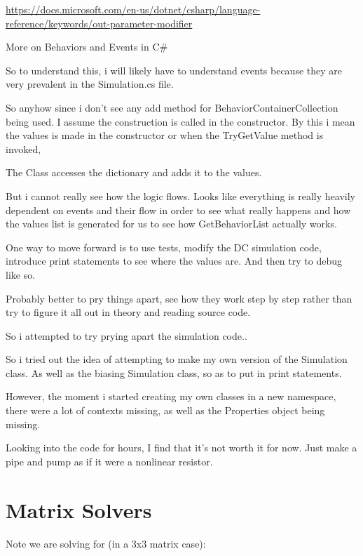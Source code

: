 \documentclass[12pt]{article}
\renewcommand{\_}{\kern-1.5pt\textunderscore\kern-1.5pt}
\begin{document}
\url{https://docs.microsoft.com/en-us/dotnet/csharp/language-reference/keywords/out-parameter-modifier}


\subparagraph{More on Behaviors and Events in C\#}

So to understand this, i will likely have to understand events because they are 
very prevalent in the Simulation.cs file.


So anyhow since i don't see any add method for BehaviorContainerCollection being used.
I assume the construction is called in the constructor.
By this i mean the \_values is made in the constructor or when the TryGetValue method is invoked,

The Class accesses the dictionary and adds it to the values.

But i cannot really see how the logic flows. Looks like everything is really heavily dependent on events and their flow 
in order to see what really happens and how the \_values list is generated
for us to see how GetBehaviorList actually works.

One way to move forward is to use tests, modify the DC simulation code,
introduce print statements to see where the values are.
And then try to debug like so.

Probably better to pry things apart, see how they work step by step
rather than try to figure it all out in theory and reading source code.

\subparagraph{So i attempted to try prying apart the simulation code..}

So i tried out the idea of attempting to make my own version of the Simulation class.
As well as the biasing Simulation class, so as to put in print statements.

However, the moment i started creating my own classes in a new namespace, 
there were a lot of contexts missing, as well as the Properties object being missing.

Looking into the code for hours, I find that it's not worth it for now.
Just make a pipe and pump as if it were a nonlinear resistor.

\part{Matrix Solvers}
Note we are solving for (in a 3x3 matrix case):
\end{document}
